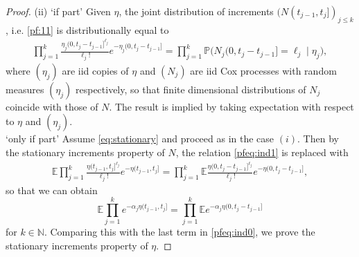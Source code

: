 \documentclass[11pt,leqno%
]{amsart}
\newcommand{\N}{\mathbb{N}}
\newcommand{\E }{{\mathbb E}}
\renewcommand{\P }{{\mathbb P}}
\newcommand{\1}{{\mathbf 1}}
\begin{document}
\begin{proof}

\noindent
(ii) `if part' %
 Given $\eta$, the
 joint distribution of increments $(N(t_{j-1},t_j])_{j\le k}$, 
 i.e. \eqref{pf:11} is distributionally equal to 
\begin{align*}
 \prod_{j=1}^k \frac{\eta_j(0,t_j-t_{j-1}]^{\ell_j}}{\ell_j!}
 e^{-\eta_j(0,t_j-t_{j-1}]} = \prod_{j=1}^k \P \big(
 N_j(0,t_j-t_{j-1}]=\ell_j \mid \eta_j
\big),
\end{align*}
where $(\eta_j)$ are iid copies of $\eta$ and $(N_j)$ are iid Cox processes
 with random measures $(\eta_j)$ respectively, so that finite
 dimensional distributions of $N_j$ coincide with those of $N$. The
 result is implied by taking expectation with respect to $\eta$ and $(\eta_j)$. \\
`only if part' Assume \eqref{eq:stationary} and proceed as in the case
 $(i)$. Then by the stationary increments property of $N$, the
 relation \eqref{pfeq:ind1} is replaced with 
 \begin{align*}
  \E \prod_{j=1}^k \frac{\eta(t_{j-1},t_j]^{\ell_j}}{\ell_j!}
  e^{-\eta(t_{j-1},t_j]} = \prod_{j=1}^k
  \E \frac{\eta(0,t_j-t_{j-1}]^{\ell_j}}{\ell_j!} e^{-\eta(0,t_j-t_{j-1}]},
 \end{align*}
 so that we can obtain
 \[
  \E \prod_{j=1}^k e^{-\alpha_j\eta(t_{j-1},t_j]} = \prod_{j=1}^k \E
 e^{-\alpha_j\eta(0,t_j-t_{j-1}]} 
 \]
 for $k \in \N$. Comparing this with the last term in
 \eqref{pfeq:ind0}, we prove the stationary increments property of $\eta$. 


\end{proof}
\end{document}
